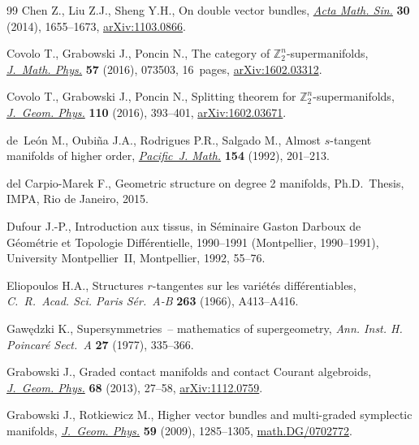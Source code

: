 \documentclass[10pt,a4paper]{amsart}
\numberwithin{equation}{section}
\begin{document}
\begin{thebibliography}{99}
Chen Z., Liu Z.J., Sheng Y.H., On double vector bundles, \href{http://dx.doi.org/10.1007/s10114-014-2412-4}{\textit{Acta Math.
  Sin.}} \textbf{30} (2014), 1655--1673, \href{http://arxiv.org/abs/1103.0866}{arXiv:1103.0866}.

Covolo T., Grabowski J., Poncin N., The category of {${\mathbb
  Z}_2^n$}-supermanifolds, \href{http://dx.doi.org/10.1063/1.4955416}{\textit{J.~Math. Phys.}} \textbf{57} (2016), 073503,
  16~pages, \href{http://arxiv.org/abs/1602.03312}{arXiv:1602.03312}.

Covolo T., Grabowski J., Poncin N., Splitting theorem for
  $\mathbb{Z}_{2}^{n}$-supermanifolds, \href{http://dx.doi.org/10.1016/j.geomphys.2016.09.006}{\textit{J.~Geom. Phys.}} \textbf{110}
  (2016), 393--401, \href{http://arxiv.org/abs/1602.03671}{arXiv:1602.03671}.

de~Le{\'o}n M., Oubi{\~n}a J.A., Rodrigues P.R., Salgado M., Almost
  {$s$}-tangent manifolds of higher order, \href{http://projecteuclid.org/euclid.pjm/1102635616}{\textit{Pacific~J. Math.}}
  \textbf{154} (1992), 201--213.

del Carpio-Marek F., Geometric structure on degree 2 manifolds, Ph.D.~Thesis,
  IMPA, Rio de Janeiro, 2015.

Dufour J.-P., Introduction aux tissus, in S\'eminaire {G}aston {D}arboux de
  {G}\'eom\'etrie et {T}opologie {D}if\/f\'erentielle, 1990--1991 ({M}ontpellier,
  1990--1991), University Montpellier~II, Montpellier, 1992, 55--76.

Eliopoulos H.A., Structures {$r$}-tangentes sur les vari\'et\'es
  dif\/f\'erentiables, \textit{C.~R.~Acad. Sci. Paris S\'er.~A-B} \textbf{263}
  (1966), A413--A416.

Gaw\k{e}dzki K., Supersymmetries~-- mathematics of supergeometry, \textit{Ann.
  Inst. H. Poincar\'e Sect.~A} \textbf{27} (1977), 335--366.

Grabowski J., Graded contact manifolds and contact {C}ourant algebroids,
  \href{http://dx.doi.org/10.1016/j.geomphys.2013.02.001}{\textit{J.~Geom. Phys.}} \textbf{68} (2013), 27--58, \href{http://arxiv.org/abs/1112.0759}{arXiv:1112.0759}.

Grabowski J., Rotkiewicz M., Higher vector bundles and multi-graded symplectic
  manifolds, \href{http://dx.doi.org/10.1016/j.geomphys.2009.06.009}{\textit{J.~Geom. Phys.}} \textbf{59} (2009), 1285--1305,
  \href{http://arxiv.org/abs/math.DG/0702772}{math.DG/0702772}.


\end{thebibliography}
\end{document}
